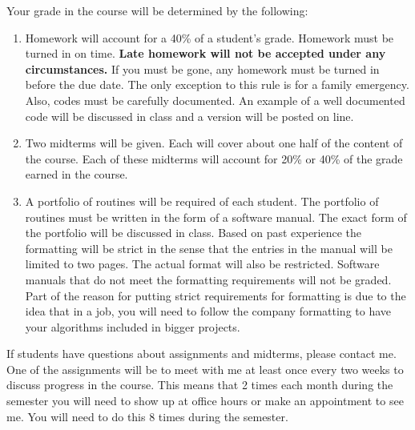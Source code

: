 \bigskip

 Your grade in the course will be determined by the
following:
\begin{enumerate}
\item Homework will account for a 40\% of a student's grade. Homework must be
      turned in on time. {\bf Late homework will not be accepted under any
      circumstances.} If you must be gone, any homework must be turned in before
      the due date. The only exception to this rule is for a family emergency.
      Also, codes must be carefully documented. An example of a well documented
      code will be discussed in class and a version will be posted on line.
\item Two midterms will be given. Each will cover about one half of the content
      of the course. Each of these midterms will account for 20\% or 40\% of the
      grade earned in the course.
\item A portfolio of routines will be required of each student. The portfolio of
      routines must be written in the form of a software manual. The exact
      form of the portfolio will be discussed in class. Based on past experience
      the formatting will be strict in the sense that the entries in the manual
      will be limited to two pages. The actual format will also be restricted.
      Software manuals that do not meet the formatting requirements will not be
      graded. Part of the reason for putting strict requirements for formatting
      is due to the idea that in a job, you will need to follow the company
      formatting to have your algorithms included in bigger projects.
\end{enumerate}
If students have questions about assignments and midterms, please contact me.
One of the assignments will be to meet with me at least once every two weeks to
discuss progress in the course. This means that 2 times each month during the
semester you will need to show up at office hours or make an appointment to see
me. You will need to do this 8 times during the semester.


